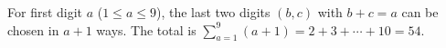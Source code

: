 For first digit $a$ ($1\le a\le9$), the last two digits $(b,c)$ with $b+c=a$ can be chosen in $a+1$ ways. The total is $\displaystyle\sum_{a=1}^{9}(a+1)=2+3+\cdots+10=\boxed{54}$.
